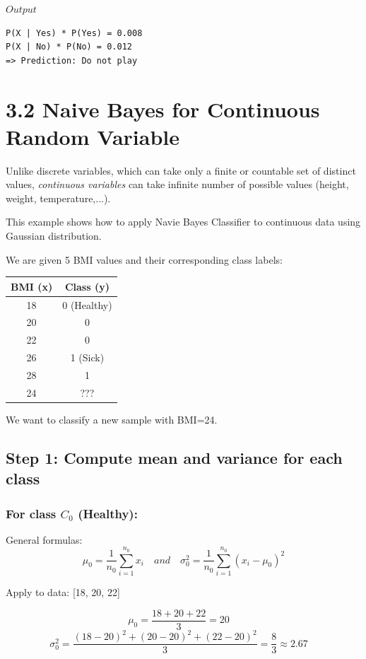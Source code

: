 \documentclass{article}
\begin{document}
$Output$

\begin{lstlisting}
P(X | Yes) * P(Yes) = 0.008
P(X | No) * P(No) = 0.012
=> Prediction: Do not play
\end{lstlisting}


\section*{3.2 Naive Bayes for Continuous Random Variable}

Unlike discrete variables, which can take only a finite or countable set of distinct values, \textit{continuous variables} can take infinite number of possible values (height, weight, temperature,...).

This example shows how to apply Navie Bayes Classifier to continuous data using Gaussian distribution.

We are given 5 BMI values and their corresponding class labels:

\begin{center}
\begin{tabular}{|c|c|}
\hline
BMI (x) & Class (y) \\
\hline
18 & 0 (Healthy) \\
20 & 0 \\
22 & 0 \\
26 & 1 (Sick) \\
28 & 1 \\
24 & ??? \\
\hline
\end{tabular}
\end{center}

We want to classify a new sample with BMI=24.

\subsection*{Step 1: Compute mean and variance for each class}
\subsubsection*{For class $C_0$ (Healthy):}

General formulas:
$$
\mu _0 = \frac{1}{n_0} \sum_{i=1}^{n_0} x_i
\quad  and \quad
\sigma_0^2 = \frac{1}{n_0} \sum_{i=1}^{n_0} (x_i - \mu  _0)^2
$$

Apply to data: [18, 20, 22]

$$
\mu_0 = \frac{18 + 20 + 22}{3} = 20
\quad
$$
$$
\sigma _0^2 = \frac{(18 - 20)^2 + (20 - 20)^2 + (22 - 20)^2}{3} = \frac{8}{3} \approx 2.67
\quad
$$
\end{document}
